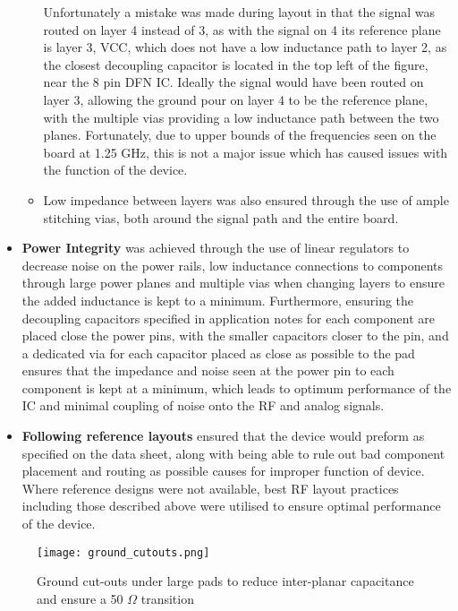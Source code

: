 \begin{itemize}
\begin{itemize}
		Unfortunately a mistake was made during layout in that the signal was routed on layer 4 instead of 3, as with the signal on 4 its reference plane is layer 3, VCC, which does not have a low inductance path to layer 2, as the closest decoupling capacitor is located in the top left of the figure, near the 8 pin DFN IC. Ideally the signal would have been routed on layer 3,  allowing the ground pour on layer 4 to be the reference plane, with the multiple vias providing a low inductance path between the two planes. Fortunately, due to upper bounds of the frequencies seen on the board at 1.25 GHz, this is not a major issue which has caused issues with the function of the device. 
		\item Low impedance between layers was also ensured through the use of ample stitching vias, both around the signal path and the entire board. 
	\end{itemize} 
	\item \textbf{Power Integrity} was achieved through the use of linear regulators to decrease noise on the power rails, low inductance connections to components through large power planes and multiple vias when changing layers to ensure the added inductance is kept to a minimum. Furthermore, ensuring the decoupling capacitors specified in application notes for each component are placed close the power pins, with the smaller capacitors closer to the pin, and a dedicated via for each capacitor placed as close as possible to the pad ensures that the impedance and noise seen at the power pin to each component is kept at a minimum, which leads to optimum performance of the IC and minimal coupling of noise onto the RF and analog signals.
	\item \textbf{Following reference layouts} ensured that the device would preform as specified on the data sheet, along with being able to rule out bad component placement and routing as possible causes for improper function of device. Where reference designs were not available, best RF layout practices including those described above were utilised to ensure optimal performance of the device.  
\end{itemize} 

\begin{figure}[H]
	\centering
	\texttt{[image: ground\_cutouts.png]}
	\caption{Ground cut-outs under large pads to reduce inter-planar capacitance and ensure a 50 $\Omega$ transition}
	\label{fig:pcb_cap_comp}
\end{figure}


